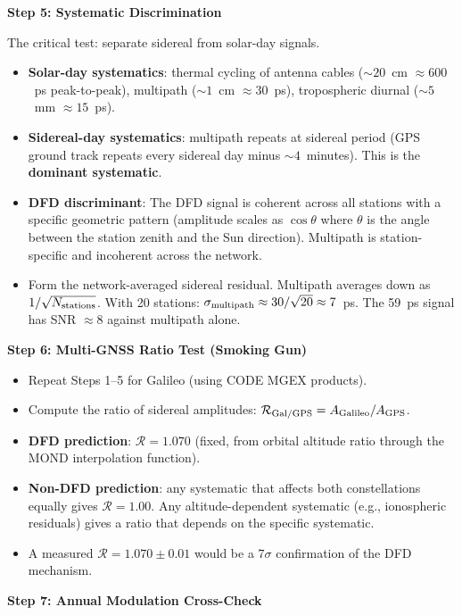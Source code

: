 \documentclass[11pt,a4paper]{article}
\begin{document}
\begin{tcolorbox}[colback=green!3!white, colframe=green!60!black,
  title=\textbf{GPS 59~ps Extraction Protocol --- Actionable for Geodesists}]
\textbf{Step 5: Systematic Discrimination}

The critical test: separate sidereal from solar-day signals.
\begin{itemize}[nosep]
\item \textbf{Solar-day systematics}: thermal cycling of antenna
  cables ($\sim 20$~cm $\approx 600$~ps peak-to-peak), multipath
  ($\sim 1$~cm $\approx 30$~ps), tropospheric diurnal
  ($\sim 5$~mm $\approx 15$~ps).
\item \textbf{Sidereal-day systematics}: multipath repeats at
  sidereal period (GPS ground track repeats every sidereal day
  minus $\sim 4$~minutes). This is the \textbf{dominant systematic}.
\item \textbf{DFD discriminant}: The DFD signal is coherent across
  all stations with a specific geometric pattern (amplitude scales
  as $\cos\theta$ where $\theta$ is the angle between the station
  zenith and the Sun direction). Multipath is station-specific and
  incoherent across the network.
\item Form the network-averaged sidereal residual. Multipath
  averages down as $1/\sqrt{N_{\rm stations}}$. With 20 stations:
  $\sigma_{\rm multipath} \approx 30/\sqrt{20} \approx 7$~ps.
  The 59~ps signal has SNR $\approx 8$ against multipath alone.
\end{itemize}

\textbf{Step 6: Multi-GNSS Ratio Test (Smoking Gun)}

\begin{itemize}[nosep]
\item Repeat Steps 1--5 for Galileo (using CODE MGEX products).
\item Compute the ratio of sidereal amplitudes:
  $\mathcal{R}_{\rm Gal/GPS} = A_{\rm Galileo}/A_{\rm GPS}$.
\item \textbf{DFD prediction}: $\mathcal{R} = 1.070$ (fixed,
  from orbital altitude ratio through the MOND interpolation function).
\item \textbf{Non-DFD prediction}: any systematic that affects both
  constellations equally gives $\mathcal{R} = 1.00$.
  Any altitude-dependent systematic (e.g., ionospheric residuals)
  gives a ratio that depends on the specific systematic.
\item A measured $\mathcal{R} = 1.070 \pm 0.01$ would be a
  $7\sigma$ confirmation of the DFD mechanism.
\end{itemize}

\textbf{Step 7: Annual Modulation Cross-Check}


\end{tcolorbox}
\end{document}
